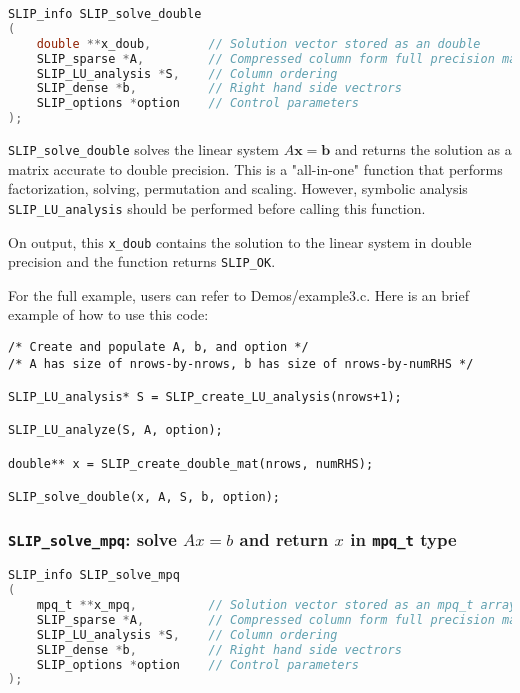 \documentclass[11pt]{article}
\theoremstyle{definition}
\begin{document}
\begin{lstlisting}[language=C,frame=single]
SLIP_info SLIP_solve_double
(
    double **x_doub,        // Solution vector stored as an double
    SLIP_sparse *A,         // Compressed column form full precision matrix A
    SLIP_LU_analysis *S,    // Column ordering
    SLIP_dense *b,          // Right hand side vectrors
    SLIP_options *option    // Control parameters
);
\end{lstlisting}

\verb|SLIP_solve_double| solves the linear system $A\mathbf{x}=\mathbf{b}$ and returns the solution as a matrix accurate to double precision. This is a "all-in-one" function that performs factorization, solving, permutation and scaling. However, symbolic analysis \verb|SLIP_LU_analysis| should be performed before calling this function.

On output, this \verb|x_doub| contains the solution to the linear system in double precision and the function returns \verb|SLIP_OK|.

For the full example, users can refer to Demos/example3.c. Here is an brief example of how to use this code:

\begin{verbatim}
/* Create and populate A, b, and option */
/* A has size of nrows-by-nrows, b has size of nrows-by-numRHS */

SLIP_LU_analysis* S = SLIP_create_LU_analysis(nrows+1);

SLIP_LU_analyze(S, A, option);

double** x = SLIP_create_double_mat(nrows, numRHS);

SLIP_solve_double(x, A, S, b, option);

\end{verbatim}


\cprotect\subsubsection{\verb|SLIP_solve_mpq|: solve $Ax=b$ and return $x$ in \verb|mpq_t| type}\label{ss:SLIP_solve_mpq}

\begin{lstlisting}[language=C,frame=single]
SLIP_info SLIP_solve_mpq
(
    mpq_t **x_mpq,          // Solution vector stored as an mpq_t array
    SLIP_sparse *A,         // Compressed column form full precision matrix A
    SLIP_LU_analysis *S,    // Column ordering
    SLIP_dense *b,          // Right hand side vectrors
    SLIP_options *option    // Control parameters
);
\end{lstlisting}
\end{document}

